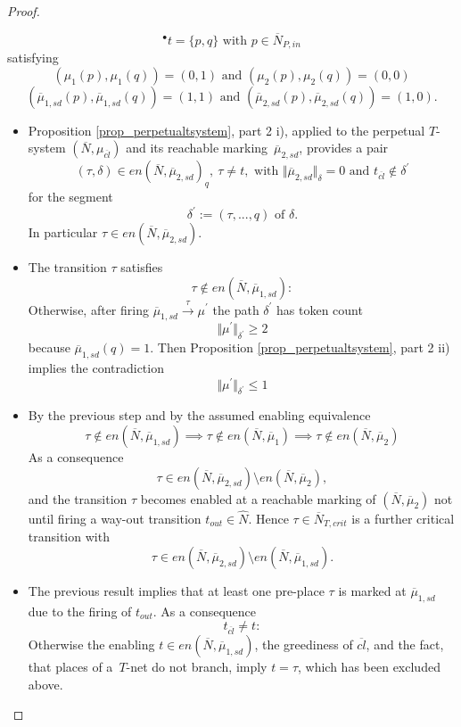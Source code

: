 \documentclass{fundam}
\begin{document}
\begin{proof}
\begin{enumerate}
$$^\bullet t=\{p,q\} \text{ with } p \in \overline{N}_{P,in}$$
satisfying
$$(\mu_1(p),\mu_1(q))=(0,1) \text{ and } (\mu_2(p),\mu_2(q))=(0,0)$$
$$(\overline{\mu}_{1,sd}(p),\overline{\mu}_{1,sd}(q))=(1,1) \text{ and } (\overline{\mu}_{2,sd}(p),\overline{\mu}_{2,sd}(q))=(1,0).$$
\begin{itemize}
\item Proposition \ref{prop_perpetualtsystem}, part 2 i), applied to the perpetual $T$-system $(\overline{N},\mu_{\overline{cl}})$ and its reachable \mbox{marking $\overline{\mu}_{2,sd}$}, provides a pair
$$(\tau,\delta) \in en(\overline{N}, \overline{\mu}_{2,sd})_q,\ \tau \neq t, \text{ with } \Vert \overline{\mu}_{2,sd} \Vert_\delta =0
\text{ and } t_{\overline{cl}} \notin \delta^\prime$$
for the segment
$$\delta^\prime:=(\tau,...,q) \text{ of }\delta.$$
In particular $\tau \in en(\overline{N},\overline{\mu}_{2,sd})$.

\item The transition $\tau$ satisfies
$$\tau \notin en(\overline{N}, \overline{\mu}_{1,sd}):$$
Otherwise, after firing $\overline{\mu}_{1,sd} \xrightarrow{\tau} \mu^\prime$ the path $\delta^\prime$ has token count
$$\Vert \mu^\prime \Vert_{\delta^\prime}\geq 2$$
because $\overline{\mu}_{1,sd}(q)=1$. Then Proposition \ref{prop_perpetualtsystem}, part 2 ii) implies the contradiction
$$\Vert \mu^\prime \Vert_{\delta^\prime}\leq 1$$
\item By the previous step and by the assumed enabling equivalence
$$\tau \notin en(\overline{N}, \overline{\mu}_{1,sd})\implies \tau \notin en(\overline{N},\overline{\mu}_1) \implies \tau \notin en(\overline{N},\overline{\mu}_2)$$
As a consequence
$$\tau \in en(\overline{N},\overline{\mu}_{2,sd}) \setminus en(\overline{N},\overline{\mu}_2),$$
and the transition $\tau$ becomes enabled at a reachable marking of $(\overline{N},\overline{\mu}_2)$ not until firing a way-out transition $t_{out} \in \hat{N}$. Hence $\tau \in \overline{N}_{T,crit}$ is a further critical transition with
$$\tau \in en(\overline{N},\overline{\mu}_{2,sd}) \setminus en(\overline{N},\overline{\mu}_{1,sd}).$$
\item The previous result implies that at least one pre-place $\tau$ is marked at $\overline{\mu}_{1,sd}$ due to the firing of $t_{out}$. As a consequence
$$t_{\overline{cl}} \neq t:$$
Otherwise the enabling $t \in en(\overline{N},\overline{\mu}_{1,sd})$, the greediness of $\overline{cl}$, and the fact, that places of \mbox{a $T$-net} do not branch, imply $t=\tau$, which has been excluded above.
\end{itemize}


\end{enumerate}
\end{proof}
\end{document}
